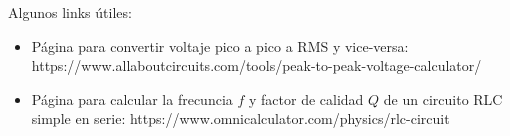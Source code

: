 Algunos links útiles: %
\begin{itemize}
	\item Página para convertir voltaje pico a pico a RMS y vice-versa: https://www.allaboutcircuits.com/tools/peak-to-peak-voltage-calculator/
	\item Página para calcular la frecuncia $f$ y factor de calidad $Q$ de un circuito RLC simple en serie: https://www.omnicalculator.com/physics/rlc-circuit %
\end{itemize}